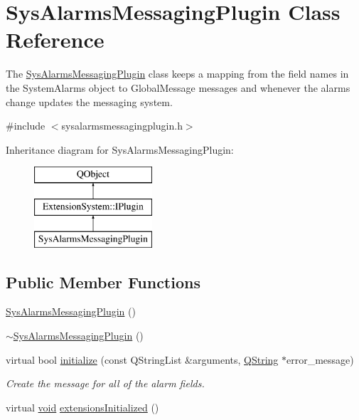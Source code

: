 \hypertarget{class_sys_alarms_messaging_plugin}{\section{Sys\-Alarms\-Messaging\-Plugin Class Reference}
\label{class_sys_alarms_messaging_plugin}
}


The \hyperlink{class_sys_alarms_messaging_plugin}{Sys\-Alarms\-Messaging\-Plugin} class keeps a mapping from the field names in the System\-Alarms object to Global\-Message messages and whenever the alarms change updates the messaging system.  




{\ttfamily \#include $<$sysalarmsmessagingplugin.\-h$>$}

Inheritance diagram for Sys\-Alarms\-Messaging\-Plugin\-:\begin{figure}[H]
\begin{center}
\leavevmode
\includegraphics[height=3.000000cm]{class_sys_alarms_messaging_plugin}
\end{center}
\end{figure}
\subsection*{Public Member Functions}
\begin{DoxyCompactItemize}
\item 
\hyperlink{group___system_ga28d933c66393f5dcb0a9f5be71c29476}{Sys\-Alarms\-Messaging\-Plugin} ()
\item 
\hyperlink{group___system_gadb9f2fd8f551a876369ad14edccafb77}{$\sim$\-Sys\-Alarms\-Messaging\-Plugin} ()
\item 
virtual bool \hyperlink{group___system_gaee946a3db8f69ee44247462593349d71}{initialize} (const Q\-String\-List \&arguments, \hyperlink{group___u_a_v_objects_plugin_gab9d252f49c333c94a72f97ce3105a32d}{Q\-String} $\ast$error\-\_\-message)
\begin{DoxyCompactList}\small\item\em Create the message for all of the alarm fields. \end{DoxyCompactList}\item 
virtual \hyperlink{group___u_a_v_objects_plugin_ga444cf2ff3f0ecbe028adce838d373f5c}{void} \hyperlink{group___system_gafbeee237df9ed93b1f831cf2f8770055}{extensions\-Initialized} ()
\end{DoxyCompactItemize}


